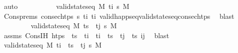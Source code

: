 \begin{isabellebody}
\ auto\isanewline
\ \ \ \ \ \ \isamarkupfalse%
\ \isamarkupfalse%
\ {}{\isacharcolon}{\kern0pt}\ {\isachardoublequoteopen}valid{\isacharunderscore}{\kern0pt}state{\isacharunderscore}{\kern0pt}seq\ M\ {\isacharbrackleft}{\kern0pt}t\isactrlsub i{\isacharprime}{\kern0pt}{\isacharbrackright}{\kern0pt}\ {\isasympi}s\ M{\isacharprime}{\kern0pt}{\isacharprime}{\kern0pt}{\isachardoublequoteclose}\isanewline
\ \ \ \ \ \ \ \ \isamarkupfalse%
\ Cons{\isachardot}{\kern0pt}prems\ {\isacartoucheopen}consec{\isacharunderscore}{\kern0pt}htps\ {\isasympi}s\ t\isactrlsub i\ t\isactrlsub i{\isacharprime}{\kern0pt}{\isacartoucheclose}\ valid{\isacharunderscore}{\kern0pt}happ{\isacharunderscore}{\kern0pt}seq{\isacharunderscore}{\kern0pt}valid{\isacharunderscore}{\kern0pt}state{\isacharunderscore}{\kern0pt}seq{\isacharunderscore}{\kern0pt}consec{\isacharunderscore}{\kern0pt}htps\ \isamarkupfalse%
\ blast\isanewline
\ \ \ \ \ \ \isamarkupfalse%
\ {}{\isacharcolon}{\kern0pt}\ {\isachardoublequoteopen}valid{\isacharunderscore}{\kern0pt}state{\isacharunderscore}{\kern0pt}seq\ M{\isacharprime}{\kern0pt}{\isacharprime}{\kern0pt}\ {\isacharparenleft}{\kern0pt}ts\ {\isacharat}{\kern0pt}\ {\isacharbrackleft}{\kern0pt}t\isactrlsub j{\isacharbrackright}{\kern0pt}{\isacharparenright}{\kern0pt}\ {\isasympi}s\ M{\isacharprime}{\kern0pt}{\isachardoublequoteclose}\isanewline
\ \ \ \ \ \ \ \ \isamarkupfalse%
\ assms\ Cons{\isachardot}{\kern0pt}IH\ {\isacartoucheopen}htps\ {\isacharequal}{\kern0pt}\ {\isacharparenleft}{\kern0pt}ts\ {\isacharat}{\kern0pt}\ {\isacharbrackleft}{\kern0pt}t\isactrlsub i{\isacharbrackright}{\kern0pt}{\isacharparenright}{\kern0pt}\ {\isacharat}{\kern0pt}\ t\isactrlsub i{\isacharprime}{\kern0pt}\ {\isacharhash}{\kern0pt}\ ts\ {\isacharat}{\kern0pt}\ t\isactrlsub j\ {\isacharhash}{\kern0pt}\ ts\ i{\isacharprime}{\kern0pt}j\ \isamarkupfalse%
\ blast\isanewline
\ \ \ \ \ \ \isamarkupfalse%
\ \isamarkupfalse%
\ {\isachardoublequoteopen}valid{\isacharunderscore}{\kern0pt}state{\isacharunderscore}{\kern0pt}seq\ M\ {\isacharparenleft}{\kern0pt}{\isacharparenleft}{\kern0pt}t\isactrlsub i{\isacharprime}{\kern0pt}\ {\isacharhash}{\kern0pt}\ ts\ {\isacharat}{\kern0pt}\ {\isacharbrackleft}{\kern0pt}t\isactrlsub j{\isacharbrackright}{\kern0pt}{\isacharparenright}{\kern0pt}\ {\isasympi}s\ M{\isacharprime}{\kern0pt}{\isachardoublequoteclose}\isanewline

\end{isabellebody}
